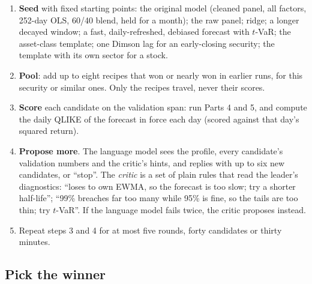 \documentclass[11pt,a4paper]{article}
\begin{document}
\begin{method}
\begin{enumerate}[leftmargin=1.4em]
  \item \textbf{Seed} with fixed starting points: the original model (cleaned panel, all factors, 252-day OLS, 60/40 blend, held for a month); the raw panel; ridge; a longer decayed window; a fast, daily-refreshed, debiased forecast with $t$-VaR; the asset-class template; one Dimson lag for an early-closing security; the template with its own sector for a stock.
  \item \textbf{Pool}: add up to eight recipes that won or nearly won in earlier runs, for this security or similar ones. Only the recipes travel, never their scores.
  \item \textbf{Score} each candidate on the validation span: run Parts 4 and 5, and compute the daily QLIKE of the forecast in force each day (scored against that day's squared return).
  \item \textbf{Propose more}. The language model sees the profile, every candidate's validation numbers and the critic's hints, and replies with up to six new candidates, or ``stop''. The \emph{critic} is a set of plain rules that read the leader's diagnostics: ``loses to own EWMA, so the forecast is too slow; try a shorter half-life''; ``99\% breaches far too many while 95\% is fine, so the tails are too thin; try $t$-VaR''. If the language model fails twice, the critic proposes instead.
  \item Repeat steps 3 and 4 for at most five rounds, forty candidates or thirty minutes.
\end{enumerate}
\end{method}

\subsection{Pick the winner}
\end{document}
